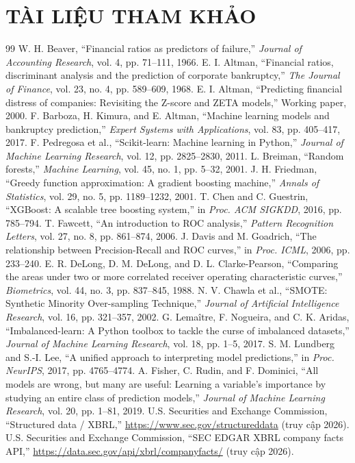 \documentclass[13pt,a4paper]{extreport}
\begin{document}
\chapter*{TÀI LIỆU THAM KHẢO}
\begin{thebibliography}{99}
 W. H. Beaver, ``Financial ratios as predictors of failure,'' \emph{Journal of
Accounting Research}, vol. 4, pp. 71--111, 1966.
 E. I. Altman, ``Financial ratios, discriminant analysis and the prediction of
corporate bankruptcy,'' \emph{The Journal of Finance}, vol. 23, no. 4, pp. 589--609, 1968.
 E. I. Altman, ``Predicting financial distress of companies: Revisiting the
Z-score and ZETA models,'' Working paper, 2000.
 F. Barboza, H. Kimura, and E. Altman, ``Machine learning models and bankruptcy
prediction,'' \emph{Expert Systems with Applications}, vol. 83, pp. 405--417, 2017.
 F. Pedregosa et al., ``Scikit-learn: Machine learning in Python,''
\emph{Journal of Machine Learning Research}, vol. 12, pp. 2825--2830, 2011.
 L. Breiman, ``Random forests,'' \emph{Machine Learning}, vol. 45, no. 1,
pp. 5--32, 2001.
 J. H. Friedman, ``Greedy function approximation: A gradient boosting
machine,'' \emph{Annals of Statistics}, vol. 29, no. 5, pp. 1189--1232, 2001.
 T. Chen and C. Guestrin, ``XGBoost: A scalable tree boosting system,'' in
\emph{Proc. ACM SIGKDD}, 2016, pp. 785--794.
 T. Fawcett, ``An introduction to ROC analysis,'' \emph{Pattern Recognition
Letters}, vol. 27, no. 8, pp. 861--874, 2006.
 J. Davis and M. Goadrich, ``The relationship between Precision-Recall and ROC
curves,'' in \emph{Proc. ICML}, 2006, pp. 233--240.
 E. R. DeLong, D. M. DeLong, and D. L. Clarke-Pearson, ``Comparing the areas
under two or more correlated receiver operating characteristic curves,'' \emph{Biometrics}, vol. 44,
no. 3, pp. 837--845, 1988.
 N. V. Chawla et al., ``SMOTE: Synthetic Minority Over-sampling Technique,''
\emph{Journal of Artificial Intelligence Research}, vol. 16, pp. 321--357, 2002.
 G. Lema\^{i}tre, F. Nogueira, and C. K. Aridas, ``Imbalanced-learn: A Python
toolbox to tackle the curse of imbalanced datasets,'' \emph{Journal of Machine Learning Research},
vol. 18, pp. 1--5, 2017.
 S. M. Lundberg and S.-I. Lee, ``A unified approach to interpreting model
predictions,'' in \emph{Proc. NeurIPS}, 2017, pp. 4765--4774.
 A. Fisher, C. Rudin, and F. Dominici, ``All models are wrong, but many are
useful: Learning a variable's importance by studying an entire class of prediction models,''
\emph{Journal of Machine Learning Research}, vol. 20, pp. 1--81, 2019.
 U.S. Securities and Exchange Commission, ``Structured data / XBRL,''
\url{https://www.sec.gov/structureddata} (truy cập 2026).
 U.S. Securities and Exchange Commission, ``SEC EDGAR XBRL company facts
API,'' \url{https://data.sec.gov/api/xbrl/companyfacts/} (truy cập 2026).
\end{thebibliography}
\end{document}
